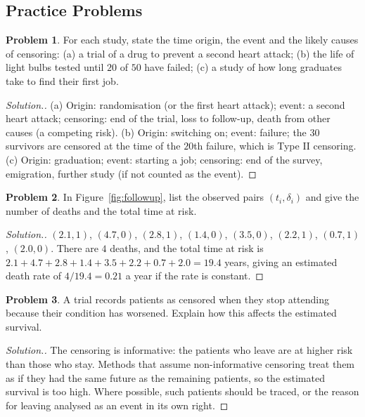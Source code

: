 \documentclass[11pt,a4paper]{article}
\numberwithin{equation}{section}
\theoremstyle{definition}
\newtheorem{problemx}{Problem}[subsection]
\newenvironment{problem}{\begin{problemx}}{\end{problemx}}
\newenvironment{solution}
  {\renewcommand{\qedsymbol}{}\begin{proof}[\textit{Solution}.]}
  {\end{proof}}
\begin{document}
\subsection{Practice Problems}

\begin{problem}
For each study, state the time origin, the event and the likely causes of censoring: (a) a trial of a drug to prevent a second heart attack; (b) the life of light bulbs tested until $20$ of $50$ have failed; (c) a study of how long graduates take to find their first job.
\end{problem}

\begin{solution}
(a) Origin: randomisation (or the first heart attack); event: a second heart attack; censoring: end of the trial, loss to follow-up, death from other causes (a competing risk). (b) Origin: switching on; event: failure; the $30$ survivors are censored at the time of the $20$th failure, which is Type II censoring. (c) Origin: graduation; event: starting a job;
censoring: end of the survey, emigration, further study (if not counted as the event).
\end{solution}

\begin{problem}
In Figure~\ref{fig:followup}, list the observed pairs $(t_i, \delta_i)$ and give the number of deaths and the total time at risk.
\end{problem}

\begin{solution}
$(2.1, 1)$, $(4.7, 0)$, $(2.8, 1)$, $(1.4, 0)$, $(3.5, 0)$, $(2.2, 1)$, $(0.7, 1)$, $(2.0, 0)$. There are $4$ deaths, and the total time at risk is $2.1 + 4.7 + 2.8 + 1.4 + 3.5 + 2.2 + 0.7 + 2.0 = 19.4$ years, giving an estimated death rate of $4/19.4 = 0.21$ a year if the rate is constant.
\end{solution}

\begin{problem}
A trial records patients as censored when they stop attending because their condition has worsened. Explain how this affects the estimated survival.
\end{problem}

\begin{solution}
The censoring is informative: the patients who leave are at higher risk than those who stay. Methods that assume non-informative censoring treat them as if they had the same future as the remaining patients, so the estimated survival is too high. Where possible, such patients should be traced, or the reason for leaving analysed as an event in its own right.
\end{solution}
\end{document}
